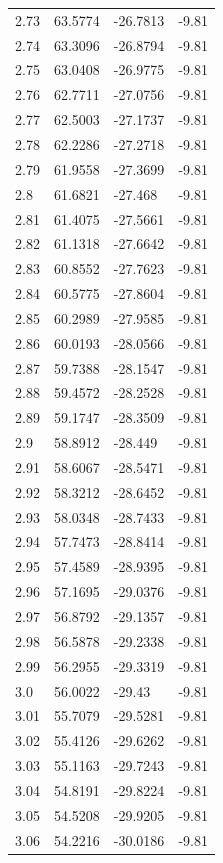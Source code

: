 \begin{tabular}{llll}
2.73 & 63.5774 & -26.7813 & -9.81 \\
2.74 & 63.3096 & -26.8794 & -9.81 \\
2.75 & 63.0408 & -26.9775 & -9.81 \\
2.76 & 62.7711 & -27.0756 & -9.81 \\
2.77 & 62.5003 & -27.1737 & -9.81 \\
2.78 & 62.2286 & -27.2718 & -9.81 \\
2.79 & 61.9558 & -27.3699 & -9.81 \\
2.8 & 61.6821 & -27.468 & -9.81 \\
2.81 & 61.4075 & -27.5661 & -9.81 \\
2.82 & 61.1318 & -27.6642 & -9.81 \\
2.83 & 60.8552 & -27.7623 & -9.81 \\
2.84 & 60.5775 & -27.8604 & -9.81 \\
2.85 & 60.2989 & -27.9585 & -9.81 \\
2.86 & 60.0193 & -28.0566 & -9.81 \\
2.87 & 59.7388 & -28.1547 & -9.81 \\
2.88 & 59.4572 & -28.2528 & -9.81 \\
2.89 & 59.1747 & -28.3509 & -9.81 \\
2.9 & 58.8912 & -28.449 & -9.81 \\
2.91 & 58.6067 & -28.5471 & -9.81 \\
2.92 & 58.3212 & -28.6452 & -9.81 \\
2.93 & 58.0348 & -28.7433 & -9.81 \\
2.94 & 57.7473 & -28.8414 & -9.81 \\
2.95 & 57.4589 & -28.9395 & -9.81 \\
2.96 & 57.1695 & -29.0376 & -9.81 \\
2.97 & 56.8792 & -29.1357 & -9.81 \\
2.98 & 56.5878 & -29.2338 & -9.81 \\
2.99 & 56.2955 & -29.3319 & -9.81 \\
3.0 & 56.0022 & -29.43 & -9.81 \\
3.01 & 55.7079 & -29.5281 & -9.81 \\
3.02 & 55.4126 & -29.6262 & -9.81 \\
3.03 & 55.1163 & -29.7243 & -9.81 \\
3.04 & 54.8191 & -29.8224 & -9.81 \\
3.05 & 54.5208 & -29.9205 & -9.81 \\
3.06 & 54.2216 & -30.0186 & -9.81 \\

\end{tabular}
